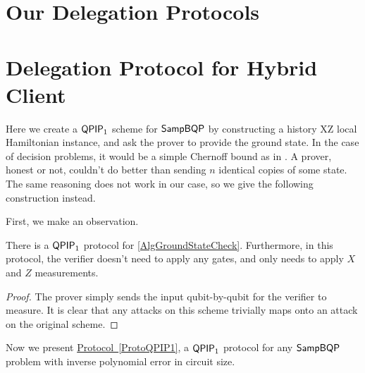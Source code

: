 \section{Our Delegation Protocols}

\section{Delegation Protocol for Hybrid Client}

Here we create a $\operatorname{\mathsf{QPIP}}_1$ scheme for $\operatorname{\mathsf{SampBQP}}$ by constructing a history XZ local Hamiltonian instance, and ask the prover to provide the ground state. In the case of decision problems, it would be a simple Chernoff bound as in \cite{kitaev2002classical}. A prover, honest or not, couldn't do better than sending $n$ identical copies of some state. The same reasoning does not work in our case, so we give the following construction instead.

First, we make an observation.

\begin{observation}
	\label{ProtoGroundStateCheck}
	There is a $\operatorname{\mathsf{QPIP}}_1$ protocol for \autoref{AlgGroundStateCheck}. Furthermore, in this protocol, the verifier doesn't need to apply any gates, and only needs to apply $X$ and $Z$ measurements.
\end{observation}
\begin{proof}
	The prover simply sends the input qubit-by-qubit for the verifier to measure. It is clear that any attacks on this scheme trivially maps onto an attack on the original scheme.
\end{proof}

Now we present \hyperref[ProtoQPIP1]{Protocol~\ref*{ProtoQPIP1}}, a $\operatorname{\mathsf{QPIP}}_1$ protocol for any $\operatorname{\mathsf{SampBQP}}$ problem with inverse polynomial error in circuit size.

